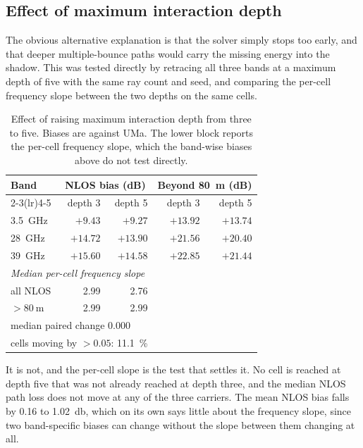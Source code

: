 \documentclass[conference]{IEEEtran}
\begin{document}
\subsection{Effect of maximum interaction depth}

The obvious alternative explanation is that the solver simply stops too early,
and that deeper multiple-bounce paths would carry the missing energy into the
shadow. This was tested directly by retracing all three bands at a maximum
depth of five with the same ray count and seed, and comparing the per-cell
frequency slope between the two depths on the same cells.

\begin{table}[t]
\caption{Effect of raising maximum interaction depth from three to five.
Biases are against UMa. The lower block reports the per-cell frequency slope,
which the band-wise biases above do not test directly.}
\label{tab:depth}
\centering
\begin{tabular}{lrrrr}
\toprule
Band & \multicolumn{2}{c}{NLOS bias (dB)} & \multicolumn{2}{c}{Beyond \SI{80}{\metre} (dB)} \\
\cmidrule(lr){2-3}\cmidrule(lr){4-5}
 & depth 3 & depth 5 & depth 3 & depth 5 \\
\midrule
\SI{3.5}{\giga\hertz} & $+9.43$ & $+9.27$ & $+13.92$ & $+13.74$ \\
\SI{28}{\giga\hertz}  & $+14.72$ & $+13.90$ & $+21.56$ & $+20.40$ \\
\SI{39}{\giga\hertz}  & $+15.60$ & $+14.58$ & $+22.85$ & $+21.44$ \\
\midrule
\multicolumn{5}{l}{\emph{Median per-cell frequency slope}} \\
all NLOS        & 2.99 & 2.76 & & \\
$>\SI{80}{\metre}$  & 2.99 & 2.99 & & \\
\multicolumn{3}{l}{median paired change $0.000$} & & \\
\multicolumn{3}{l}{cells moving by $>0.05$: \SI{11.1}{\percent}} & & \\
\bottomrule
\end{tabular}
\end{table}

It is not, and the per-cell slope is the test that settles it. No cell is
reached at depth five that was not already reached at depth three, and the
median NLOS path loss does not move at any of the three carriers. The mean
NLOS bias falls by \SI{0.16}{} to \SI{1.02}{\decibel}, which on its own says
little about the frequency slope, since two band-specific biases can change
without the slope between them changing at all.
\end{document}
